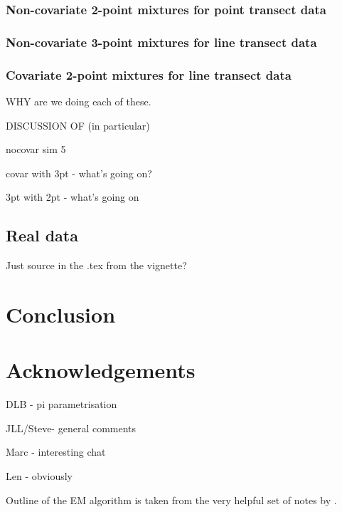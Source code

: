\subsubsection{Non-covariate 2-point mixtures for point transect data}

\subsubsection{Non-covariate 3-point mixtures for line transect data}

\subsubsection{Covariate 2-point mixtures for line transect data}





WHY are we doing each of these.

DISCUSSION OF (in particular)

nocovar sim 5

covar with 3pt - what's going on?

3pt with 2pt - what's going on





\subsection{Real data}

Just source in the .tex from the vignette?




\section{Conclusion}


\section{Acknowledgements}
DLB - pi parametrisation

JLL/Steve- general comments

Marc - interesting chat

Len - obviously

Outline of the EM algorithm is taken from the very helpful set of notes by \cite{piater}.

